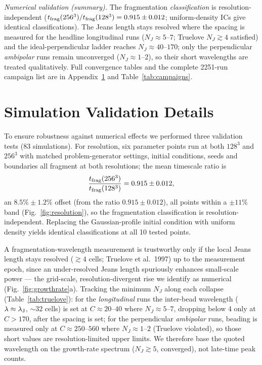 \documentclass[usenatbib,twoside,twocolumn]{mnras}
\begin{document}
\emph{Numerical validation (summary).} The fragmentation \emph{classification} is resolution-independent ($t_{\rm frag}(256^3)/t_{\rm frag}(128^3)=0.915\pm0.012$; uniform-density ICs give identical classifications). The Jeans length stays resolved where the spacing is measured for the headline longitudinal runs ($N_J\approx5$--$7$; Truelove $N_J\gtrsim4$ satisfied) and the ideal-perpendicular ladder reaches $N_J\approx40$--$170$; only the perpendicular \emph{ambipolar} runs remain unconverged ($N_J\approx1$--$2$), so their short wavelengths are treated qualitatively. Full convergence tables and the complete 2251-run campaign list are in Appendix~\ref{sec:validation} and Table~\ref{tab:campaigns}.


\section{Simulation Validation Details}
\label{sec:validation}

To ensure robustness against numerical effects we performed three validation tests (83 simulations). For resolution, six parameter points run at both $128^3$ and $256^3$ with matched problem-generator settings, initial conditions, seeds and boundaries all fragment at both resolutions; the mean timescale ratio is
\begin{equation}
\frac{t_{\rm frag}(256^3)}{t_{\rm frag}(128^3)} = 0.915 \pm 0.012,
\end{equation}
an $8.5\%\pm1.2\%$ offset (from the ratio $0.915\pm0.012$), all points within a $\pm11\%$ band (Fig.~\ref{fig:resolution}), so the fragmentation classification is resolution-independent. Replacing the Gaussian-profile initial condition with uniform density yields identical classifications at all 10 tested points.

A fragmentation-wavelength measurement is trustworthy only if the local Jeans length stays resolved ($\gtrsim4$ cells; Truelove et al.\ 1997) up to the measurement epoch, since an under-resolved Jeans length spuriously enhances small-scale power --- the grid-scale, resolution-divergent rise we identify as numerical (Fig.~\ref{fig:growthrate}a). Tracking the minimum $N_J$ along each collapse (Table~\ref{tab:truelove}): for the \emph{longitudinal} runs the inter-bead wavelength ($\lambda\approx\lambda_{\rm J}$, $\sim32$ cells) is set at $C\approx20$--$40$ where $N_J\approx5$--$7$, dropping below 4 only at $C>170$, after the spacing is set; for the perpendicular \emph{ambipolar} runs, beading is measured only at $C\approx250$--$560$ where $N_J\approx1$--$2$ (Truelove violated), so those short values are resolution-limited upper limits. We therefore base the quoted wavelength on the growth-rate spectrum ($N_J\gtrsim5$, converged), not late-time peak counts.
\end{document}
